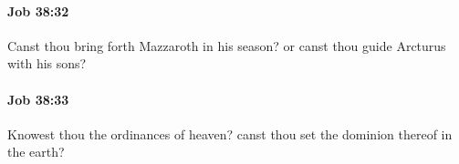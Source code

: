 		\paragraph{Job 38:32} %
			\label{JOB-38-32}

			Canst thou bring forth Mazzaroth in his season? or canst thou guide Arcturus with his sons?


		\paragraph{Job 38:33} %
			\label{JOB-38-33}

			Knowest thou the ordinances of heaven? canst thou set the dominion thereof in the earth?


